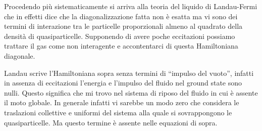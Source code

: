 \documentclass[12pt,a4paper]{article}
\begin{document}
Procedendo più sistematicamente si arriva alla teoria del liquido di Landau-Fermi che in effetti dice che la diagonalizzazione fatta non è esatta ma vi sono dei termini di interazione tra le particelle proporzionali almeno al quadrato della densità di quasiparticelle. Supponendo di avere poche eccitazioni possiamo trattare il gas come non interagente e accontentarci di questa Hamiltoniana diagonale.

Landau scrive l'Hamiltoniana sopra senza termini di ``impulso del vuoto'', infatti in assenza di eccitazioni l'energia e l'impulso del fluido nel ground state sono nulli. Questo significa che mi trovo nel sistema di riposo del fluido in cui è assente il moto globale. In generale infatti vi sarebbe un modo zero che considera le traslazioni collettive e uniformi del sistema alla quale si sovrappongono le quasiparticelle. Ma questo termine è assente nelle equazioni di sopra.
\end{document}

